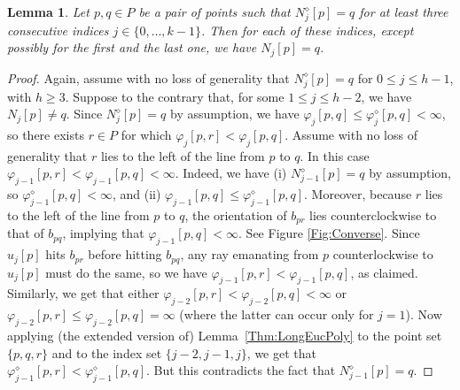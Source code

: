 \documentclass[letter,11pt]{article}
\newtheorem{lemma}[theorem]{Lemma}
\def\poly{\diamond}
\def\bisect{b}
\def\Nbrs{N}
\begin{document}
\begin{lemma}\label{Thm:LongPolygEuc}
Let $p,q\in P$ be a pair of points such that $\Nbrs_j^\poly[p]=q$ for at least three consecutive indices $j\in \{0,\ldots, k-1\}$.
Then for each of these indices, except possibly for the first and the last one, we have $\Nbrs_j[p]=q$.
\end{lemma}
\begin{proof} 
Again, assume with no
  loss of generality that $\Nbrs_j^\poly[p]=q$ for $0\leq j\leq h-1$, with
  $h\geq 3$.  Suppose to the contrary that, for some $1\leq j\leq h-2$, we have $\Nbrs_j[p]\neq q$.  Since $\Nbrs^\poly_j[p]=q$
  by assumption, we have $\varphi_j[p,q]\leq
  \varphi_j^\poly[p,q]<\infty$, so there exists $r\in P$ for which
  $\varphi_j[p,r]<\varphi_j[p,q]$.  Assume with no loss of generality
  that $r$ lies to the left of the line from $p$ to $q$. In this case $\varphi_{j-1}[p,r]<\varphi_{j-1}[p,q]<\infty$. Indeed, we have (i) $\Nbrs_{j-1}^\poly[p]=q$ by assumption,
  so $\varphi_{j-1}^\poly[p,q]<\infty$, and (ii) $\varphi_{j-1}[p,q]\leq
  \varphi_{j-1}^\poly[p,q]$. Moreover,
  because $r$ lies to the left of the line from $p$ to $q$, the orientation of $\bisect_{pr}$ lies counterclockwise to that of $\bisect_{pq}$,
  implying that $\varphi_{j-1}[p,q]<\infty$.
  See Figure \ref{Fig:Converse}. Since $u_j[p]$ hits $\bisect_{pr}$ before hitting $\bisect_{pq}$, any ray emanating from $p$ counterlockwise to $u_j[p]$ must do the same, so we have $\varphi_{j-1}[p,r]<\varphi_{j-1}[p,q]$, as claimed. Similarly, we get that either
  $\varphi_{j-2}[p,r]<\varphi_{j-2}[p,q]<\infty$ or
  $\varphi_{j-2}[p,r]\leq \varphi_{j-2}[p,q]=\infty$ (where the latter
  can occur only for $j=1$).  Now applying (the extended version of)
  Lemma~\ref{Thm:LongEucPoly} to the point set $\{p,q,r\}$ and to
  the index set $\{j-2,j-1,j\}$, we get that
  $\varphi^\poly_{j-1}[p,r]<\varphi^\poly_{j-1}[p,q]$. But this
  contradicts the fact that $\Nbrs_{j-1}^\poly[p]=q$.
\end{proof}
\end{document}
